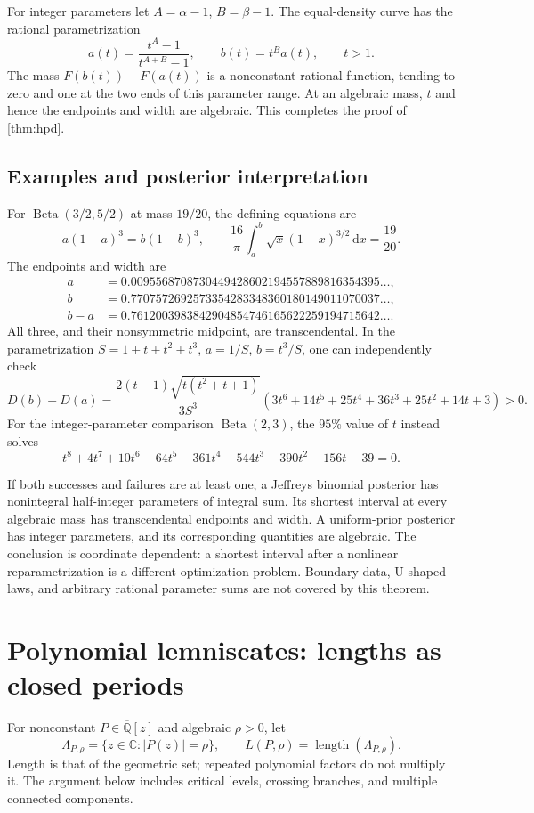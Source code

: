 \documentclass[11pt,a4paper]{article}
\numberwithin{equation}{section}
\theoremstyle{definition}
\theoremstyle{remark}
\newcommand{\Qb}{\overline{\mathbb Q}}
\newcommand{\C}{\mathbb C}
\newcommand{\length}{\operatorname{length}}
\newcommand{\dd}{\,\mathrm d}
\begin{document}
For integer parameters let $A=\alpha-1$, $B=\beta-1$. The equal-density
curve has the rational parametrization
\[
 a(t)=\frac{t^A-1}{t^{A+B}-1},\qquad b(t)=t^Ba(t),\qquad t>1.
\]
The mass $F(b(t))-F(a(t))$ is a nonconstant rational function, tending to
zero and one at the two ends of this parameter range. At an algebraic mass,
$t$ and hence the endpoints and width are algebraic. This completes the
proof of \cref{thm:hpd}.

\subsection{Examples and posterior interpretation}
For $\operatorname{Beta}(3/2,5/2)$ at mass $19/20$, the defining equations are
\[
 a(1-a)^3=b(1-b)^3,\qquad
 \frac{16}\pi\int_a^b\sqrt{x}(1-x)^{3/2}\dd x=\frac{19}{20}.
\]
The endpoints and width are
\begin{align*}
 a&=0.0095568708730449428602194557889816354395\ldots,\\
 b&=0.7707572692573354283348360180149011070037\ldots,\\
 b-a&=0.7612003983842904854746165622259194715642\ldots.
\end{align*}
All three, and their nonsymmetric midpoint, are transcendental. In the
parametrization $S=1+t+t^2+t^3$, $a=1/S$, $b=t^3/S$, one can independently
check
\[
 D(b)-D(a)=\frac{2(t-1)\sqrt{t(t^2+t+1)}}{3S^3}
 (3t^6+14t^5+25t^4+36t^3+25t^2+14t+3)>0.
\]
For the integer-parameter comparison $\operatorname{Beta}(2,3)$, the
$95\%$ value of $t$ instead solves
\[
 t^8+4t^7+10t^6-64t^5-361t^4-544t^3-390t^2-156t-39=0.
\]

If both successes and failures are at least one, a Jeffreys binomial
posterior has nonintegral half-integer parameters of integral sum. Its
shortest interval at every algebraic mass has transcendental endpoints and
width. A uniform-prior posterior has integer parameters, and its corresponding
quantities are algebraic. The conclusion is coordinate dependent: a shortest
interval after a nonlinear reparametrization is a different optimization
problem. Boundary data, U-shaped laws, and arbitrary rational parameter sums
are not covered by this theorem.

\section{Polynomial lemniscates: lengths as closed periods}\label{sec:lemniscate}
For nonconstant $P\in\Qb[z]$ and algebraic $\rho>0$, let
\[
 \Lambda_{P,\rho}=\{z\in\C:|P(z)|=\rho\},\qquad
 L(P,\rho)=\length(\Lambda_{P,\rho}).
\]
Length is that of the geometric set; repeated polynomial factors do not
multiply it. The argument below includes critical levels, crossing branches,
and multiple connected components.
\end{document}
